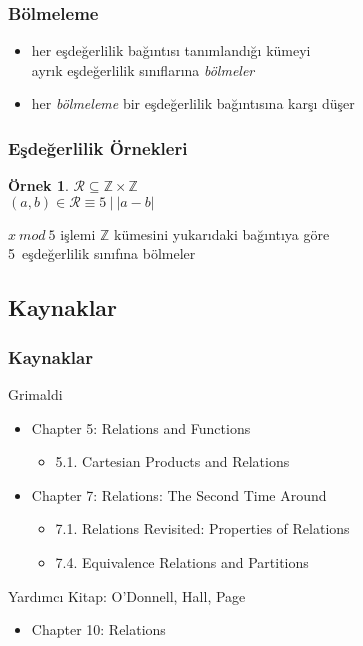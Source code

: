 \documentclass[dvipsnames]{beamer}
\theoremstyle{definition}
\theoremstyle{example}
\newtheorem{ornek}[theorem]{Örnek}
\theoremstyle{plain}
\begin{document}
\begin{frame}
  \frametitle{Bölmeleme}

  \begin{itemize}
    \item her eşdeğerlilik bağıntısı tanımlandığı kümeyi\\
      ayrık eşdeğerlilik sınıflarına \emph{bölmeler}

    \pause
    \medskip
    \item her \emph{bölmeleme} bir eşdeğerlilik bağıntısına karşı düşer
  \end{itemize}
\end{frame}

\begin{frame}
  \frametitle{Eşdeğerlilik Örnekleri}

  \begin{ornek}
    $\mathcal{R} \subseteq \mathbb{Z} \times \mathbb{Z}$\\
    $(a,b) \in \mathcal{R} \equiv 5~|~|a - b|$

    \pause
    \bigskip
    $x~mod~5$ işlemi $\mathbb{Z}$ kümesini yukarıdaki bağıntıya göre\\
    5~eşdeğerlilik sınıfına bölmeler
  \end{ornek}
\end{frame}

\subsection*{Kaynaklar}

\begin{frame}
  \frametitle{Kaynaklar}

  \begin{block}{Grimaldi}
    \begin{itemize}
      \item Chapter 5: Relations and Functions
      \begin{itemize}
        \item 5.1. \alert{Cartesian Products and Relations}
      \end{itemize}
      \item Chapter 7: Relations: The Second Time Around
      \begin{itemize}
        \item 7.1. \alert{Relations Revisited: Properties of Relations}
        \item 7.4. \alert{Equivalence Relations and Partitions}
      \end{itemize}
    \end{itemize}
  \end{block}

  \begin{block}{Yardımcı Kitap: O'Donnell, Hall, Page}
    \begin{itemize}
      \item Chapter 10: Relations
    \end{itemize}
  \end{block}
\end{frame}
\end{document}
